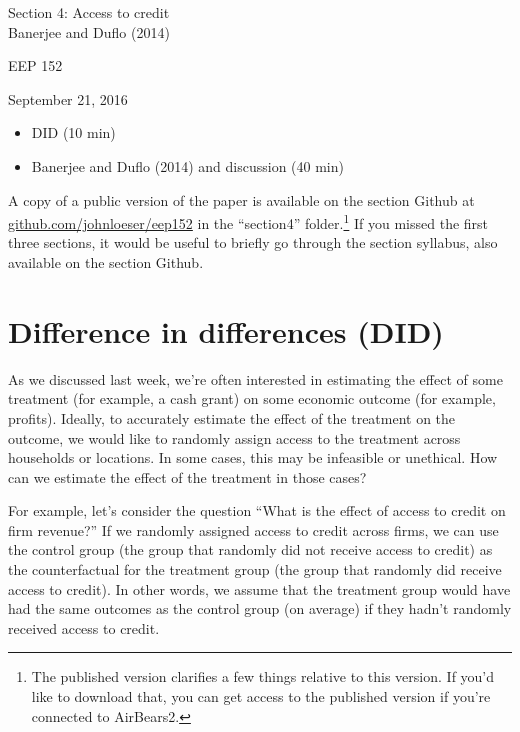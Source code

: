 \documentclass[12pt,english]{article}
\begin{document}
\begin{center}
{\Large{}Section 4: Access to credit} \\
{\large{}Banerjee and Duflo (2014)}
\par\end{center}{\Large \par}

\begin{center}
EEP 152
\par\end{center}

\begin{center}
September 21, 2016
\par\end{center}

\begin{itemize}
	\setlength\itemsep{-0.5em}
	\item DID (10 min)
	\item Banerjee and Duflo (2014) and discussion (40 min)
\end{itemize}
A copy of a public version of the paper is available on the section Github at \href{github.com/johnloeser/eep152}{github.com/johnloeser/eep152} in the ``section4'' folder.\footnote{The published version clarifies a few things relative to this version. If you'd like to download that, you can get access to the published version if you're connected to AirBears2.} If you missed the first three sections, it would be useful to briefly go through the section syllabus, also available on the section Github.

\section{Difference in differences (DID)}

As we discussed last week, we're often interested in estimating the effect of some treatment (for example, a cash grant) on some economic outcome (for example, profits). Ideally, to accurately estimate the effect of the treatment on the outcome, we would like to randomly assign access to the treatment across households or locations. In some cases, this may be infeasible or unethical. How can we estimate the effect of the treatment in those cases?

For example, let's consider the question ``What is the effect of access to credit on firm revenue?'' If we randomly assigned access to credit across firms, we can use the control group (the group that randomly did not receive access to credit) as the counterfactual for the treatment group (the group that randomly did receive access to credit). In other words, we assume that the treatment group would have had the same outcomes as the control group (on average) if they hadn't randomly received access to credit.
\end{document}
